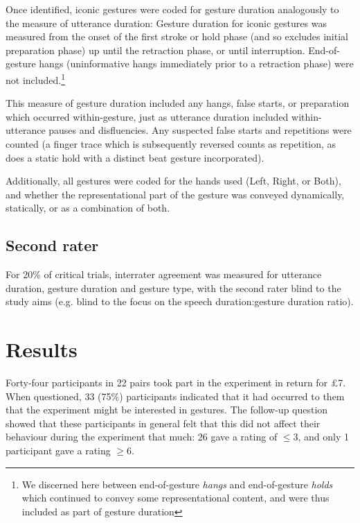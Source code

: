 \documentclass[a4paper,man,natbib]{apa6}
\newcommand*{\term}[1]{\emph{#1}} %
\begin{document}
Once identified, iconic gestures were coded for gesture duration analogously to the measure of utterance duration:
Gesture duration for iconic gestures was measured from the onset of the first stroke or hold phase (and so excludes initial preparation phase) up until the retraction phase, or until interruption.
End-of-gesture hangs (uninformative hangs immediately prior to a retraction phase) were not included.\footnote{We discerned here between end-of-gesture \term{hangs} and end-of-gesture \term{holds} which continued to convey some representational content, and were thus included as part of gesture duration}

This measure of gesture duration included any hangs, false starts, or preparation which occurred within-gesture, just as utterance duration included within-utterance pauses and disfluencies.
Any suspected false starts and repetitions were counted (a finger trace which is subsequently reversed counts as repetition, as does a static hold with a distinct beat gesture incorporated).

Additionally, all gestures were coded for the hands used (Left, Right, or Both), and whether the representational part of the gesture was conveyed dynamically, statically, or as a combination of both. 

\subsection{Second rater}
For 20\% of critical trials, interrater agreement was measured for utterance duration, gesture duration and gesture type, with the second rater blind to the study aims (e.g. blind to the focus on the speech duration:gesture duration ratio).


\section{Results}
Forty-four participants in 22 pairs took part in the experiment in return for \pounds{7}.
When questioned, 33 (75\%) participants indicated that it had occurred to them that the experiment might be interested in gestures.
The follow-up question showed that these participants in general felt that this did not affect their behaviour during the experiment that much: 26 gave a rating of $\leq$3, and only 1 participant gave a rating $\geq$6. 
\end{document}
